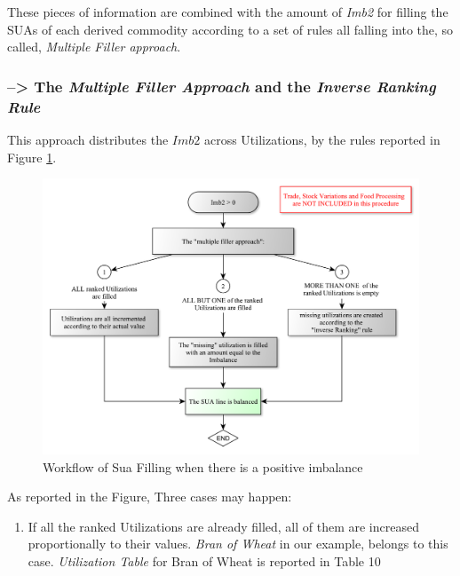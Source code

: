 \documentclass[]{article}
\providecommand{\tightlist}{%
  \setlength{\itemsep}{0pt}\setlength{\parskip}{0pt}}
\begin{document}
These pieces of information are combined with the amount of \emph{Imb2}
for filling the SUAs of each derived commodity according to a set of
rules all falling into the, so called, \emph{Multiple Filler approach}.

\subsubsection*{\texorpdfstring{--\textgreater{} The \emph{Multiple
Filler Approach} and the \emph{Inverse Ranking
Rule}}{--\textgreater{} The Multiple Filler Approach and the Inverse Ranking Rule}}\label{the-multiple-filler-approach-and-the-inverse-ranking-rule}

This approach distributes the \(Imb2\) across Utilizations, by the rules
reported in Figure \ref{fig:f7}.

\begin{figure}

{\centering \includegraphics{images/07_PositiveImbalance} 

}

\caption{\label{fig:f5}Workflow of Sua Filling when there is a positive imbalance}\label{fig:f7}
\end{figure}

As reported in the Figure, Three cases may happen:

\begin{enumerate}
\def\labelenumi{\arabic{enumi}.}
\tightlist
\item
  If all the ranked Utilizations are already filled, all of them are
  increased proportionally to their values. \emph{Bran of Wheat} in our
  example, belongs to this case. \emph{Utilization Table} for Bran of
  Wheat is reported in Table 10
\end{enumerate}
\end{document}
